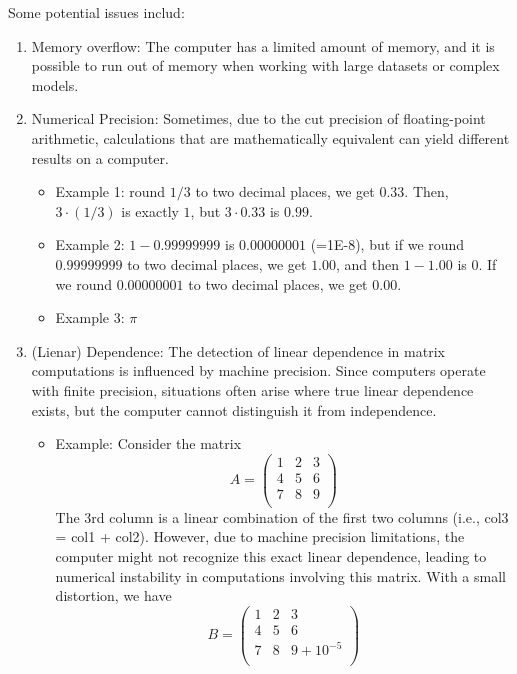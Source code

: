\documentclass[
  letterpaper,
  DIV=11,
  numbers=noendperiod]{scrreprt}
\providecommand{\tightlist}{%
  \setlength{\itemsep}{0pt}\setlength{\parskip}{0pt}}
\begin{document}
Some potential issues includ:

\begin{enumerate}
\def\labelenumi{\arabic{enumi}.}
\item
  Memory overflow: The computer has a limited amount of memory, and it
  is possible to run out of memory when working with large datasets or
  complex models.
\item
  Numerical Precision: Sometimes, due to the cut precision of
  floating-point arithmetic, calculations that are mathematically
  equivalent can yield different results on a computer.

  \begin{itemize}
  \tightlist
  \item
    Example 1: round \(1/3\) to two decimal places, we get \(0.33\).
    Then, \(3 \cdot (1/3)\) is exactly \(1\), but \(3 \cdot 0.33\) is
    \(0.99\).
  \item
    Example 2: \(1 - 0.99999999\) is \(0.00000001\) (=1E-8), but if we
    round \(0.99999999\) to two decimal places, we get \(1.00\), and
    then \(1 - 1.00\) is \(0\). If we round \(0.00000001\) to two
    decimal places, we get \(0.00\).
  \item
    Example 3: \(\pi\)
  \end{itemize}
\item
  (Lienar) Dependence: The detection of linear dependence in matrix
  computations is influenced by machine precision. Since computers
  operate with finite precision, situations often arise where true
  linear dependence exists, but the computer cannot distinguish it from
  independence.

  \begin{itemize}
  \tightlist
  \item
    Example: Consider the matrix \[
     A = \begin{pmatrix}
     1 & 2 & 3 \\
     4 & 5 & 6 \\
     7 & 8 & 9 \\
     \end{pmatrix}
     \] The 3rd column is a linear combination of the first two columns
    (i.e., col3 = col1 + col2). However, due to machine precision
    limitations, the computer might not recognize this exact linear
    dependence, leading to numerical instability in computations
    involving this matrix. With a small distortion, we have \[
     B = \begin{pmatrix}
     1 & 2 & 3 \\
     4 & 5 & 6 \\
     7 & 8 & 9 + 10^{-5} \\
     \end{pmatrix}
     \]
  \end{itemize}
\end{enumerate}
\end{document}

